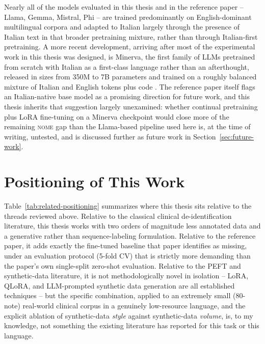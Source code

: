 \documentclass[12pt,a4paper]{report}
\newcommand{\NOME}{\textsc{nome}}
\begin{document}
Nearly all of the models evaluated in this thesis and in the reference paper -- Llama, Gemma, Mistral, Phi -- are trained predominantly on English-dominant multilingual corpora and adapted to Italian largely through the presence of Italian text in that broader pretraining mixture, rather than through Italian-first pretraining. A more recent development, arriving after most of the experimental work in this thesis was designed, is Minerva, the first family of LLMs pretrained from scratch with Italian as a first-class language rather than an afterthought, released in sizes from 350M to 7B parameters and trained on a roughly balanced mixture of Italian and English tokens plus code \citep{orlando2024minerva}. The reference paper itself flags an Italian-native base model as a promising direction for future work, and this thesis inherits that suggestion largely unexamined: whether continual pretraining plus LoRA fine-tuning on a Minerva checkpoint would close more of the remaining \NOME{} gap than the Llama-based pipeline used here is, at the time of writing, untested, and is discussed further as future work in Section~\ref{sec:future-work}.

\section{Positioning of This Work}

Table~\ref{tab:related-positioning} summarizes where this thesis sits relative to the threads reviewed above. Relative to the classical clinical de-identification literature, this thesis works with two orders of magnitude less annotated data and a generative rather than sequence-labeling formulation. Relative to the reference paper, it adds exactly the fine-tuned baseline that paper identifies as missing, under an evaluation protocol (5-fold CV) that is strictly more demanding than the paper's own single-split zero-shot evaluation. Relative to the PEFT and synthetic-data literature, it is not methodologically novel in isolation -- LoRA, QLoRA, and LLM-prompted synthetic data generation are all established techniques -- but the specific combination, applied to an extremely small (80-note) real-world clinical corpus in a genuinely low-resource language, and the explicit ablation of synthetic-data \emph{style} against synthetic-data \emph{volume}, is, to my knowledge, not something the existing literature has reported for this task or this language.
\end{document}
